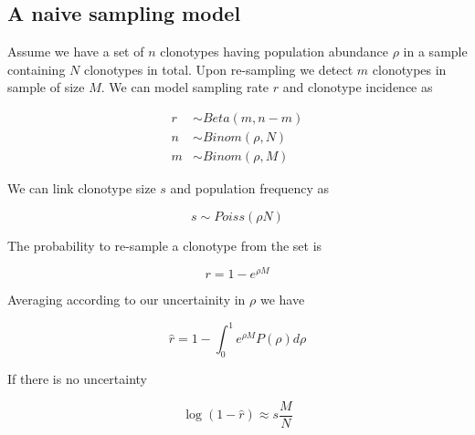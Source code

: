 \documentclass[12pt]{article}
\begin{document}
\subsection{A naive sampling model}

Assume we have a set of $n$ clonotypes having population abundance $\rho$ in a sample containing $N$ clonotypes in total. Upon re-sampling we detect $m$ clonotypes in sample of size $M$. We can model sampling rate $r$ and clonotype incidence as 

\begin{align}
r &\sim Beta(m, n - m) \\
n &\sim Binom(\rho, N) \\
m &\sim Binom(\rho, M)
\end{align}

We can link clonotype size $s$ and population frequency as

\begin{equation}
s \sim Poiss(\rho N)
\end{equation}

The probability to re-sample a clonotype from the set is

\begin{equation}
r = 1 - e^{\rho M}
\end{equation}

Averaging according to our uncertainity in $\rho$ we have

\begin{equation}
\hat{r} = 1 - \int_0^1 e^{\rho M} P(\rho) d\rho
\end{equation}

If there is no uncertainty

\begin{equation}
\log\left(1 - \hat{r}\right) \approx s \frac{M}{N}
\end{equation}
\end{document}
